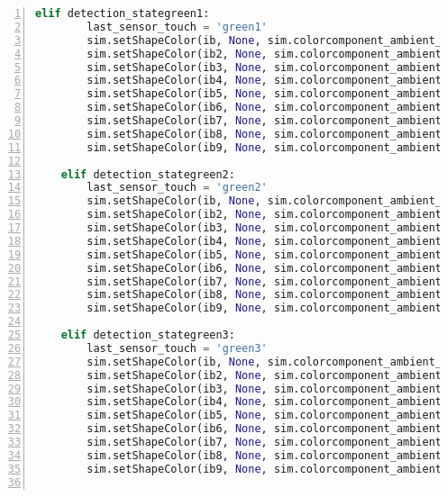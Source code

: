 \begin{lstlisting}[language=Python, frame=single, numbers=left, captionpos=b, basicstyle=\ttfamily\small, showstringspaces=false, breaklines=true, tabsize=4, xleftmargin=15pt]
    elif detection_stategreen1:
        last_sensor_touch = 'green1'
        sim.setShapeColor(ib, None, sim.colorcomponent_ambient_diffuse, [0, 1, 0])
        sim.setShapeColor(ib2, None, sim.colorcomponent_ambient_diffuse, [0, 1, 0])
        sim.setShapeColor(ib3, None, sim.colorcomponent_ambient_diffuse, [1, 1, 1])
        sim.setShapeColor(ib4, None, sim.colorcomponent_ambient_diffuse, [1, 1, 1])
        sim.setShapeColor(ib5, None, sim.colorcomponent_ambient_diffuse, [0, 0, 0])
        sim.setShapeColor(ib6, None, sim.colorcomponent_ambient_diffuse, [1, 1, 1])
        sim.setShapeColor(ib7, None, sim.colorcomponent_ambient_diffuse, [1, 1, 1])
        sim.setShapeColor(ib8, None, sim.colorcomponent_ambient_diffuse, [0, 0, 0])
        sim.setShapeColor(ib9, None, sim.colorcomponent_ambient_diffuse, [1, 1, 1])
 
    elif detection_stategreen2:
        last_sensor_touch = 'green2'
        sim.setShapeColor(ib, None, sim.colorcomponent_ambient_diffuse, [0, 1, 0])
        sim.setShapeColor(ib2, None, sim.colorcomponent_ambient_diffuse, [0, 1, 0])
        sim.setShapeColor(ib3, None, sim.colorcomponent_ambient_diffuse, [0, 0, 0])
        sim.setShapeColor(ib4, None, sim.colorcomponent_ambient_diffuse, [1, 1, 1])
        sim.setShapeColor(ib5, None, sim.colorcomponent_ambient_diffuse, [0, 0, 0])
        sim.setShapeColor(ib6, None, sim.colorcomponent_ambient_diffuse, [0, 0, 0])
        sim.setShapeColor(ib7, None, sim.colorcomponent_ambient_diffuse, [0, 0, 0])
        sim.setShapeColor(ib8, None, sim.colorcomponent_ambient_diffuse, [1, 1, 1])
        sim.setShapeColor(ib9, None, sim.colorcomponent_ambient_diffuse, [0, 0, 0])
     
    elif detection_stategreen3:
        last_sensor_touch = 'green3'
        sim.setShapeColor(ib, None, sim.colorcomponent_ambient_diffuse, [0, 1, 0])
        sim.setShapeColor(ib2, None, sim.colorcomponent_ambient_diffuse, [0, 1, 0])
        sim.setShapeColor(ib3, None, sim.colorcomponent_ambient_diffuse, [0, 0, 0])
        sim.setShapeColor(ib4, None, sim.colorcomponent_ambient_diffuse, [1, 1, 1])
        sim.setShapeColor(ib5, None, sim.colorcomponent_ambient_diffuse, [0, 0, 0])
        sim.setShapeColor(ib6, None, sim.colorcomponent_ambient_diffuse, [0, 0, 0])
        sim.setShapeColor(ib7, None, sim.colorcomponent_ambient_diffuse, [1, 1, 1])
        sim.setShapeColor(ib8, None, sim.colorcomponent_ambient_diffuse, [0, 0, 0])
        sim.setShapeColor(ib9, None, sim.colorcomponent_ambient_diffuse, [0, 0, 0])
 

\end{lstlisting}
